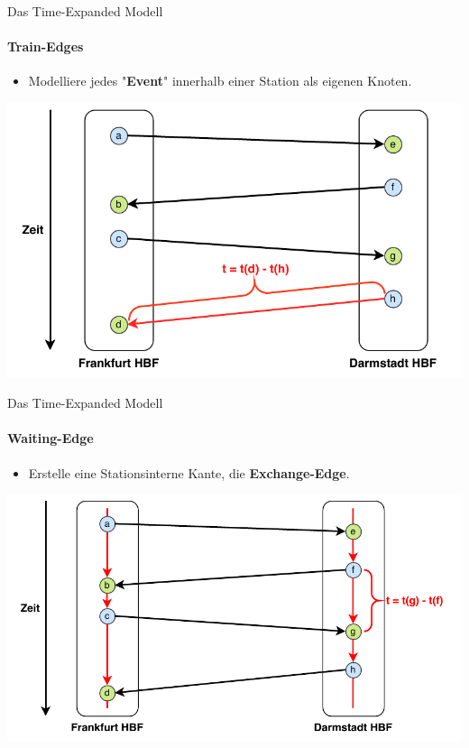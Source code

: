 

\begin{frame}{Das Time-Expanded Modell}
\framesubtitle{Train-Edges}
	\begin{itemize}{}
		\item Modelliere jedes "{}\textbf{Event}"{} innerhalb einer Station als eigenen Knoten. 
	\end{itemize}

	\begin{center}
		\includegraphics[width=.72\linewidth]{images/time-expanded-basic.pdf} 
	\end{center}
\end{frame}


\begin{frame}{Das Time-Expanded Modell}
\framesubtitle{Waiting-Edge}
	\begin{itemize}
		\item Erstelle eine Stationsinterne Kante, die \textbf{Exchange-Edge}. 
	\end{itemize}

	\begin{center}
	\hspace{5em}
		\includegraphics[width=.78\linewidth]{images/time-expanded-basic-2.pdf} 
	\end{center}
\end{frame}


